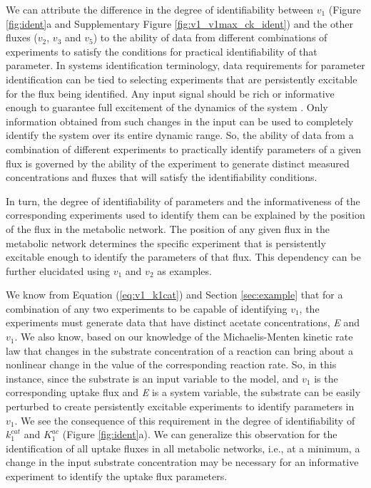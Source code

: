 \documentclass[10pt]{article}
\begin{document}
	We can attribute the difference in the degree of identifiability between $v_1$ (Figure \ref{fig:ident}a and Supplementary Figure \ref{fig:v1_v1max_ck_ident}) and the other fluxes ($v_2$, $v_3$ and $v_5$) to the ability of data from different combinations of experiments to satisfy the conditions for practical identifiability of that parameter. In systems identification terminology, data requirements for parameter identification can be tied to selecting experiments that are persistently excitable for the flux being identified. Any input signal should be rich or informative enough to guarantee full excitement of the dynamics of the system \parencite{Ljung1994}. Only information obtained from such changes in the input can be used to completely identify the system over its entire dynamic range. So, the ability of data from a combination of different experiments to practically identify parameters of a given flux is governed by the ability of the experiment to generate distinct measured concentrations and fluxes that will satisfy the identifiability conditions. 	
	
	In turn, the degree of identifiability of parameters and the informativeness of the corresponding experiments used to identify them can be explained by the position of the flux in the metabolic network. The position of any given flux in the metabolic network determines the specific experiment that is persistently excitable enough to identify the parameters of that flux. This dependency can be further elucidated using $v_1$ and $v_2$ as examples. 
	
	We know from Equation (\ref{eq:v1_k1cat}) and Section \ref{sec:example} that for a combination of any two experiments to be capable of identifying $v_1$, the experiments must generate data that have distinct acetate concentrations, \textit{E} and $v_1$. We also know, based on our knowledge of the Michaelis-Menten kinetic rate law that changes in the substrate concentration of a reaction can bring about a nonlinear change in the value of the corresponding reaction rate. So, in this instance, since the substrate is an input variable to the model, and $v_1$ is the corresponding uptake flux and \textit{E} is a system variable, the substrate can be easily perturbed to create persistently excitable experiments to identify parameters in $v_1$. We see the consequence of this requirement in the degree of identifiability of $k_1^{cat}$ and $K_1^{ac}$ (Figure \ref{fig:ident}a). We can generalize this observation for the identification of all uptake fluxes in all metabolic networks, i.e., at a minimum, a change in the input substrate concentration may be necessary for an informative experiment to identify the uptake flux parameters. 
	
\end{document}
